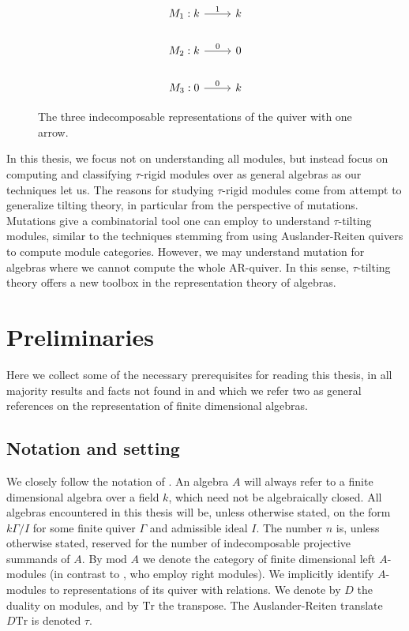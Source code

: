 \documentclass[]{article}
\theoremstyle{definition}
\newcommand{\mo}{\ensuremath{\text{mod }}}
\newcommand{\tu}{\ensuremath{\tau}}
\begin{document}
\begin{figure}
	\[\begin{tikzcd}
		M_1: k & k \\
		M_2: k & 0 \\
		M_3: 0 & k
		\arrow[from=3-1, to=3-2,"0"]
		\arrow[from=2-1, to=2-2,"0"]
		\arrow[from=1-1, to=1-2,"1"]
	\end{tikzcd}\]
\caption{The three indecomposable representations of the quiver with one arrow.}

\end{figure}


In this thesis, we focus not on understanding all modules, but instead focus on computing and classifying \tu-rigid modules over as general algebras as our techniques let us. The reasons for studying \tu-rigid modules come from attempt to generalize tilting theory, in particular from the perspective of mutations. Mutations give a combinatorial tool one can employ to understand \tu-tilting modules, similar to the techniques stemming from using Auslander-Reiten quivers to compute module categories. However, we may understand mutation for algebras where we cannot compute the whole AR-quiver. In this sense, \tu-tilting theory offers a new toolbox in the representation theory of algebras.




\section{Preliminaries}
Here we collect some of the necessary prerequisites for reading this thesis, in all majority results and facts not found in \cite{auslander_reiten_smalo_1995} and \cite{assem_skowronski_simson_2006} which we refer two as general references on the representation of finite dimensional algebras.

\subsection{Notation and setting}
We closely follow the notation of \cite{assem_skowronski_simson_2006}. An algebra $A$ will always refer to a finite dimensional algebra over a field $k$, which need not be algebraically closed. All algebras encountered in this thesis will be, unless otherwise stated, on the form $k\Gamma/I$ for some finite quiver $\Gamma$ and admissible ideal $I$. The number $n$ is, unless otherwise stated, reserved for the number of indecomposable projective summands of $A$. By $\mo A$ we denote the category of finite dimensional left $A$-modules (in contrast to \cite{assem_skowronski_simson_2006}, who employ right modules). We implicitly identify $A$-modules to representations of its quiver with relations. We denote by $D$ the duality on modules, and by $\text{Tr}$ the transpose. The Auslander-Reiten translate $D\text{Tr}$ is denoted $\tau$.
\end{document}

